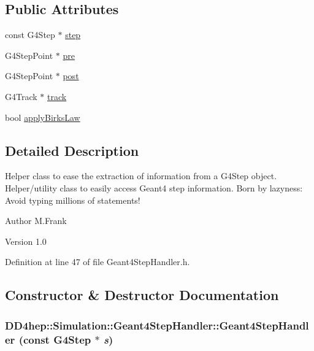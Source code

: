 \subsection*{Public Attributes}
\begin{DoxyCompactItemize}
\item 
const G4Step $\ast$ \hyperlink{class_d_d4hep_1_1_simulation_1_1_geant4_step_handler_a5f8ecf6b8e58ab857df4d639d9b8f235}{step}
\item 
G4StepPoint $\ast$ \hyperlink{class_d_d4hep_1_1_simulation_1_1_geant4_step_handler_a7c18f2d6e46ecbb380fbe0995029accb}{pre}
\item 
G4StepPoint $\ast$ \hyperlink{class_d_d4hep_1_1_simulation_1_1_geant4_step_handler_aed9081f8334e95c40e321c14621c0a35}{post}
\item 
G4Track $\ast$ \hyperlink{class_d_d4hep_1_1_simulation_1_1_geant4_step_handler_a8bb7d5d357693c499d319fdc1fa3b34b}{track}
\item 
bool \hyperlink{class_d_d4hep_1_1_simulation_1_1_geant4_step_handler_ae14ced51d527345a4efed73a39ecd1c0}{applyBirksLaw}
\end{DoxyCompactItemize}


\subsection{Detailed Description}
Helper class to ease the extraction of information from a G4Step object. Helper/utility class to easily access Geant4 step information. Born by lazyness: Avoid typing millions of statements!

\begin{DoxyAuthor}{Author}
M.Frank 
\end{DoxyAuthor}
\begin{DoxyVersion}{Version}
1.0 
\end{DoxyVersion}


Definition at line 47 of file Geant4StepHandler.h.

\subsection{Constructor \& Destructor Documentation}
\hypertarget{class_d_d4hep_1_1_simulation_1_1_geant4_step_handler_aa523240f8dd670751a61d26b02c4e0a7}{
\subsubsection[{Geant4StepHandler}]{\setlength{\rightskip}{0pt plus 5cm}DD4hep::Simulation::Geant4StepHandler::Geant4StepHandler (const G4Step $\ast$ {\em s})}}
\label{class_d_d4hep_1_1_simulation_1_1_geant4_step_handler_aa523240f8dd670751a61d26b02c4e0a7}


